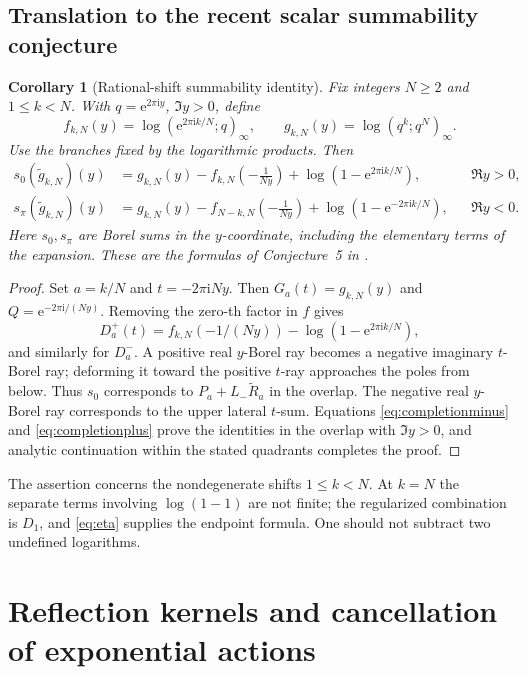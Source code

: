 \documentclass[11pt,a4paper]{article}
\numberwithin{equation}{section}
\newtheorem{corollary}[theorem]{Corollary}
\theoremstyle{definition}
\theoremstyle{remark}
\newcommand{\ii}{\mathrm i}
\newcommand{\e}{\mathrm e}
\newcommand{\wt}{\widetilde}
\begin{document}
\subsection{Translation to the recent scalar summability conjecture}
\begin{corollary}[Rational-shift summability identity]
\label{cor:fr}
Fix integers $N\geq2$ and $1\leq k<N$. With $q=\e^{2\pi\ii y}$,
$\Im y>0$, define
\[
 f_{k,N}(y)=\log(\e^{2\pi\ii k/N};q)_\infty,\qquad
 g_{k,N}(y)=\log(q^k;q^N)_\infty.
\]
Use the branches fixed by the logarithmic products. Then
\begin{align}
 s_0(\wt g_{k,N})(y)
 &=g_{k,N}(y)-f_{k,N}\!\left(-\frac1{Ny}\right)
       +\log(1-\e^{2\pi\ii k/N}),&&\Re y>0,\label{eq:fr0}\\
 s_\pi(\wt g_{k,N})(y)
 &=g_{k,N}(y)-f_{N-k,N}\!\left(-\frac1{Ny}\right)
       +\log(1-\e^{-2\pi\ii k/N}),&&\Re y<0.\label{eq:frpi}
\end{align}
Here $s_0,s_\pi$ are Borel sums in the $y$-coordinate, including the
elementary terms of the expansion. These are the formulas of
Conjecture~5 in \cite[version 2, equations (60a)--(60b)]{fr}.
\end{corollary}
\begin{proof}
Set $a=k/N$ and $t=-2\pi\ii Ny$. Then $G_a(t)=g_{k,N}(y)$ and
$Q=\e^{-2\pi\ii/(Ny)}$. Removing the zero-th factor in $f$ gives
\[
 D_a^+(t)=f_{k,N}(-1/(Ny))-\log(1-\e^{2\pi\ii k/N}),
\]
and similarly for $D_a^-$. A positive real $y$-Borel ray becomes a
negative imaginary $t$-Borel ray; deforming it toward the positive
$t$-ray approaches the poles from below. Thus $s_0$ corresponds to
$P_a+L_-\wt R_a$ in the overlap. The negative real $y$-Borel ray
corresponds to the upper lateral $t$-sum. Equations
\eqref{eq:completionminus} and \eqref{eq:completionplus} prove the
identities in the overlap with $\Im y>0$, and analytic continuation
within the stated quadrants completes the proof.
\end{proof}

The assertion concerns the nondegenerate shifts $1\leq k<N$. At
$k=N$ the separate terms involving $\log(1-1)$ are not finite; the
regularized combination is $D_1$, and \eqref{eq:eta} supplies the
endpoint formula. One should not subtract two undefined logarithms.

\section{Reflection kernels and cancellation of exponential actions}
\label{sec:reflection}
\end{document}

